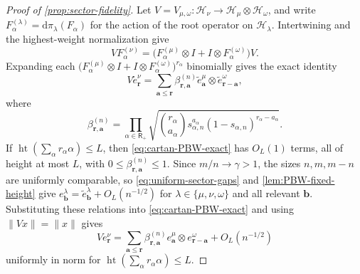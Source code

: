 \documentclass[11pt]{article}
\theoremstyle{remark}
\theoremstyle{plain}
\newcommand{\cH}{\mathcal H}
\newcommand{\dd}{\mathrm d}
\newcommand{\ot}{\otimes}
\begin{document}
\begin{proof}[Proof of \cref{prop:sector-fidelity}]
Let
\(V=V_{\mu,\omega}:\cH_\nu\to\cH_\mu\ot\cH_\omega\), and write
\(F_\alpha^{(\lambda)}=\dd\pi_\lambda(F_\alpha)\) for the action of the root
operator on \(\cH_\lambda\).  Intertwining and the highest-weight
normalization give
\[
  VF_\alpha^{(\nu)}
  =\bigl(F_\alpha^{(\mu)}\ot I+I\ot F_\alpha^{(\omega)}\bigr)V.
\]
Expanding each
\(\bigl(F_\alpha^{(\mu)}\ot I+I\ot F_\alpha^{(\omega)}\bigr)^{r_\alpha}\)
binomially gives the exact identity
\begin{equation}\label{eq:cartan-PBW-exact}
  V\widetilde e_{\mathbf r}^{\nu}
  =\sum_{\mathbf a\le\mathbf r}
    \beta_{\mathbf r,\mathbf a}^{(n)}
    \widetilde e_{\mathbf a}^{\mu}
    \ot\widetilde e_{\mathbf r-\mathbf a}^{\omega},
\end{equation}
where
\begin{equation}\label{eq:cartan-coefficients}
  \beta_{\mathbf r,\mathbf a}^{(n)}
  =\prod_{\alpha\in\mathsf R_+}
   \sqrt{\binom{r_\alpha}{a_\alpha}
   s_{\alpha,n}^{a_\alpha}
   (1-s_{\alpha,n})^{r_\alpha-a_\alpha}}.
\end{equation}
If \(\operatorname{ht}(\sum_\alpha r_\alpha\alpha)\le L\),
then \eqref{eq:cartan-PBW-exact} has \(O_L(1)\) terms, all of height at
most \(L\), with
\(0\le\beta_{\mathbf r,\mathbf a}^{(n)}\le1\).
Since \(m/n\to\gamma>1\), the sizes \(n,m,m-n\) are uniformly comparable, so
\eqref{eq:uniform-sector-gaps} and \cref{lem:PBW-fixed-height} give
\(e_{\mathbf b}^{\lambda}=\widetilde e_{\mathbf b}^{\lambda}
+O_L(n^{-1/2})\) for \(\lambda\in\{\mu,\nu,\omega\}\) and all relevant
\(\mathbf b\).  Substituting these relations into
\eqref{eq:cartan-PBW-exact} and using \(\|Vx\|=\|x\|\) gives
\begin{equation}\label{eq:cartan-orthonormal-fixed-height}
  Ve_{\mathbf r}^{\nu}
  =\sum_{\mathbf a\le\mathbf r}
    \beta_{\mathbf r,\mathbf a}^{(n)}
    e_{\mathbf a}^{\mu}\ot e_{\mathbf r-\mathbf a}^{\omega}
    +O_L(n^{-1/2})
\end{equation}
uniformly in norm for
\(\operatorname{ht}(\sum_\alpha r_\alpha\alpha)\le L\).


\end{proof}
\end{document}
